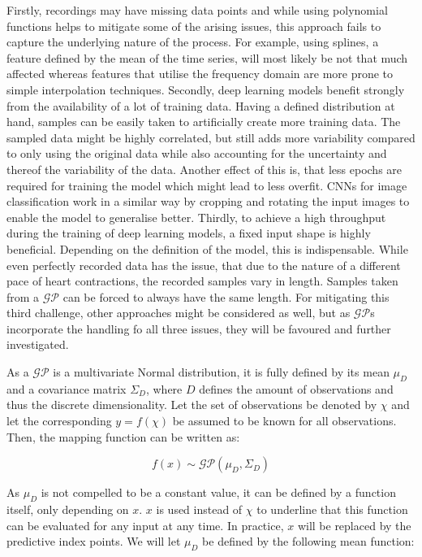 \documentclass[11pt]{scrartcl}
\begin{document}
Firstly, recordings may have missing data points and while using polynomial functions helps to mitigate some of the arising issues, this approach fails to capture the underlying nature of the process. For example, using splines, a feature defined by the mean of the time series, will most likely be not that much affected whereas features that utilise the frequency domain are more prone to simple interpolation techniques. Secondly, deep learning models benefit strongly from the availability of a lot of training data. Having a defined distribution at hand, samples can be easily taken to artificially create more training data. The sampled data might be highly correlated, but still adds more variability compared to only using the original data while also accounting for the uncertainty and thereof the variability of the data. Another effect of this is, that less epochs are required for training the model which might lead to less overfit. CNNs for image classification work in a similar way by cropping and rotating the input images to enable the model to generalise better. Thirdly, to achieve a high throughput during the training of deep learning models, a fixed input shape is highly beneficial. Depending on the definition of the model, this is indispensable. While even perfectly recorded data has the issue, that due to the nature of a different pace of heart contractions, the recorded samples vary in length. Samples taken from a $\mathcal{GP}$ can be forced to always have the same length. For mitigating this third challenge, other approaches might be considered as well, but as $\mathcal{GP}$s incorporate the handling fo all three issues, they will be favoured and further investigated.

As a $\mathcal{GP}$ is a multivariate Normal distribution, it is fully defined by its mean $\mu_D$ and a covariance matrix $\Sigma_D$, where $D$ defines the amount of observations and thus the discrete dimensionality. Let the set of observations be denoted by $\chi$ and let the corresponding $y = f(\chi)$ be assumed to be known for all observations. Then, the mapping function can be written as:

\begin{equation}
\label{eq:gp_basic}
    f(x) \sim \mathcal{GP}(\mu_D, \Sigma_D)
\end{equation}

As $\mu_D$ is not compelled to be a constant value, it can be defined by a function itself, only depending on $x$. $x$ is used instead of $\chi$ to underline that this function can be evaluated for any input at any time. In practice, $x$ will be replaced by the predictive index points. We will let $\mu_D$ be defined by the following mean function:
\end{document}
